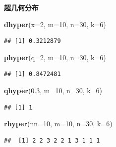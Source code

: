 \documentclass[]{article}
\newenvironment{Shaded}{\begin{snugshade}}{\end{snugshade}}
\newcommand{\KeywordTok}[1]{\textcolor[rgb]{0.13,0.29,0.53}{\textbf{{#1}}}}
\newcommand{\DataTypeTok}[1]{\textcolor[rgb]{0.13,0.29,0.53}{{#1}}}
\newcommand{\DecValTok}[1]{\textcolor[rgb]{0.00,0.00,0.81}{{#1}}}
\newcommand{\FloatTok}[1]{\textcolor[rgb]{0.00,0.00,0.81}{{#1}}}
\newcommand{\NormalTok}[1]{{#1}}
\begin{document}
\textbf{超几何分布}

\begin{Shaded}
\begin{Highlighting}[]
\KeywordTok{dhyper}\NormalTok{(}\DataTypeTok{x=}\DecValTok{2}\NormalTok{, }\DataTypeTok{m=}\DecValTok{10}\NormalTok{, }\DataTypeTok{n=}\DecValTok{30}\NormalTok{, }\DataTypeTok{k=}\DecValTok{6}\NormalTok{)}
\end{Highlighting}
\end{Shaded}

\begin{verbatim}
## [1] 0.3212879
\end{verbatim}

\begin{Shaded}
\begin{Highlighting}[]
\KeywordTok{phyper}\NormalTok{(}\DataTypeTok{q=}\DecValTok{2}\NormalTok{, }\DataTypeTok{m=}\DecValTok{10}\NormalTok{, }\DataTypeTok{n=}\DecValTok{30}\NormalTok{, }\DataTypeTok{k=}\DecValTok{6}\NormalTok{)}
\end{Highlighting}
\end{Shaded}

\begin{verbatim}
## [1] 0.8472481
\end{verbatim}

\begin{Shaded}
\begin{Highlighting}[]
\KeywordTok{qhyper}\NormalTok{(}\FloatTok{0.3}\NormalTok{, }\DataTypeTok{m=}\DecValTok{10}\NormalTok{, }\DataTypeTok{n=}\DecValTok{30}\NormalTok{, }\DataTypeTok{k=}\DecValTok{6}\NormalTok{)}
\end{Highlighting}
\end{Shaded}

\begin{verbatim}
## [1] 1
\end{verbatim}

\begin{Shaded}
\begin{Highlighting}[]
\KeywordTok{rhyper}\NormalTok{(}\DataTypeTok{nn=}\DecValTok{10}\NormalTok{, }\DataTypeTok{m=}\DecValTok{10}\NormalTok{, }\DataTypeTok{n=}\DecValTok{30}\NormalTok{, }\DataTypeTok{k=}\DecValTok{6}\NormalTok{)}
\end{Highlighting}
\end{Shaded}

\begin{verbatim}
##  [1] 2 2 3 2 2 1 3 1 1 1
\end{verbatim}
\end{document}
